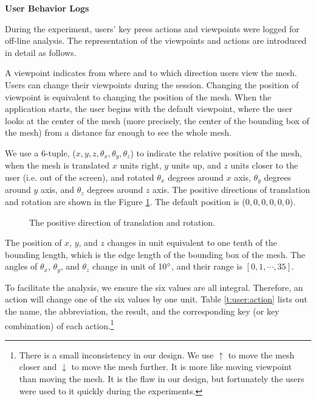 \textbf{User Behavior Logs}

During the experiment, users' key press actions and viewpoints
were logged for off-line analysis. The representation of the viewpoints
and actions are introduced in detail as follows.

A viewpoint indicates from where and to which direction users view the mesh.
Users can change their viewpoints during the session. Changing the position of 
viewpoint is equivalent to changing the position of the mesh. 
When the application starts, the user begins with the default viewpoint,
where the user looks at the center of the mesh (more precisely,  the center of the bounding box of the mesh)
from a distance far enough to see the whole mesh. 

We use a 6-tuple, ($x, y, z, \theta_x, \theta_y, \theta_z$) to indicate the relative position of the mesh,
when the mesh is translated $x$ units right, $y$ units up, and $z$ units closer to the user (i.e. out of the screen),
and rotated $\theta_x$ degrees around $x$ axis, $\theta_y$ degrees around $y$ axis,
and $\theta_z$ degrees around $z$ axis. 
The positive directions of translation and rotation are shown in the Figure \ref{f:user:viewpoint}.
The default position is ($0, 0, 0, 0, 0, 0$).
\begin{figure}
    \centering
    \caption{The positive direction of translation and rotation.}
    \label{f:user:viewpoint}
\end{figure}
The position of $x$, 
$y$, and $z$ changes in unit equivalent to one tenth of the bounding length, which is the edge length
of the bounding box of the mesh. The angles of $\theta_x$, $\theta_y$, and $\theta_z$ change in unit of 10$^\circ$,
and their range is $[0, 1, \cdots, 35]$.

To facilitate the analysis, we ensure the six values are all integral. 
Therefore, an action will change one of the six values by one unit.
Table \ref{t:user:action} lists out the name, the abbreviation, the result,
and the corresponding key (or key combination) of each action.\footnote{
There is a small inconsistency in our design. 
We use $\uparrow$ to move the mesh closer and $\downarrow$ to move the mesh
further. It is more like moving viewpoint than moving the mesh. 
It is the flaw in our design, but fortunately the users were used to it quickly
during the experiments.}

